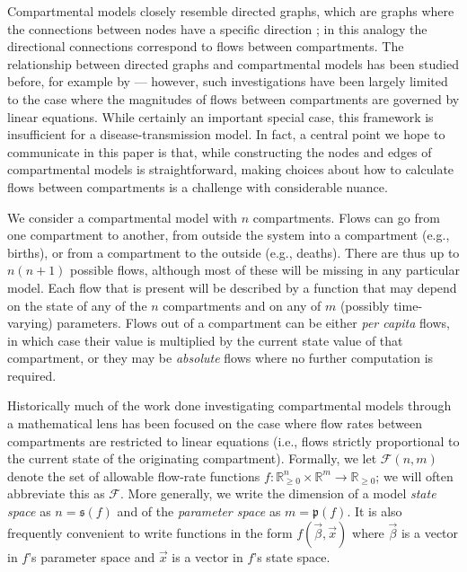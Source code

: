 \documentclass{article}
\theoremstyle{definition}
\newcommand{\R}{\mathbb{R}}%
\newcommand{\Rnn}{\mathbb{R}_{\ge 0}}%
\newcommand{\pardim}[1]{\mathfrak{p}(#1)}%
\newcommand{\stadim}[1]{\mathfrak{s}(#1)}%
\newcommand{\fr}{\ensuremath{\mathcal F}}
\newcommand{\define}[1]{\emph{{#1}}}
\begin{document}
Compartmental models closely resemble directed graphs, which are graphs where the connections between nodes have a specific direction \citep{roberts2009applied}; in this analogy the directional connections correspond to flows between compartments. The relationship between directed graphs and compartmental models has been studied before, for example by \cite{walter1999compartmental} --- however, such investigations have been largely limited to the case where the magnitudes of flows between compartments are governed by linear equations. While certainly an important special case, this framework is insufficient for a disease-transmission model. In fact, a central point we hope to communicate in this paper is that, while constructing the nodes and edges of compartmental models is straightforward, making choices about how to calculate flows between compartments is a challenge with considerable nuance.

We consider a compartmental model with $n$ compartments. Flows can go from one compartment to another, from outside the system into a compartment (e.g., births), or from a compartment to the outside (e.g., deaths). There are thus up to $n(n+1)$ possible flows, although most of these will be missing in any particular model. Each flow that is present will be described by a function that may depend on the state of any of the $n$ compartments and on any of $m$ (possibly time-varying) parameters. Flows out of a compartment can be either \define{per capita} flows, in which case their value is multiplied by the current state value of that compartment, or they may be \define{absolute} flows where no further computation is required.

Historically much of the work done investigating compartmental models through a mathematical lens has been focused on the case where flow rates between compartments are restricted to linear equations (i.e., flows strictly proportional to the current state of the originating compartment).
Formally, we let $\fr(n, m)$ denote the set of allowable flow-rate functions $f:\Rnn^n\times\R^m\rightarrow \Rnn$; we will often abbreviate this as \fr. More generally, we write the dimension of a model \textit{state space} as $n=\stadim{f}$ and of the  \textit{parameter space} as $m=\pardim{f}$. It is also frequently convenient to write functions in the form $f(\vec{\beta}, \vec{x})$ where $\vec{\beta}$ is a vector in $f$'s parameter space and $\vec{x}$ is a vector in $f$'s state space. 
\end{document}
